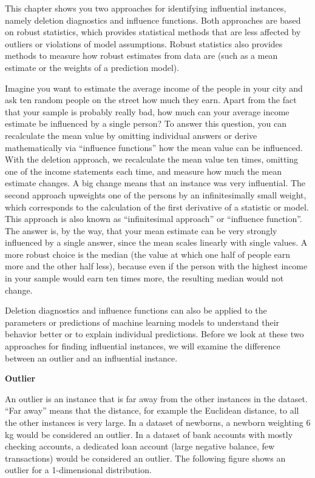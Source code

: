 \documentclass[
  11pt,
]{scrbook}
\begin{document}
This chapter shows you two approaches for identifying influential instances, namely deletion diagnostics and influence functions.
Both approaches are based on robust statistics, which provides statistical methods that are less affected by outliers or violations of model assumptions.
Robust statistics also provides methods to measure how robust estimates from data are (such as a mean estimate or the weights of a prediction model).

Imagine you want to estimate the average income of the people in your city and ask ten random people on the street how much they earn.
Apart from the fact that your sample is probably really bad, how much can your average income estimate be influenced by a single person?
To answer this question, you can recalculate the mean value by omitting individual answers or derive mathematically via ``influence functions'' how the mean value can be influenced.
With the deletion approach, we recalculate the mean value ten times, omitting one of the income statements each time, and measure how much the mean estimate changes.
A big change means that an instance was very influential.
The second approach upweights one of the persons by an infinitesimally small weight, which corresponds to the calculation of the first derivative of a statistic or model.
This approach is also known as ``infinitesimal approach'' or ``influence function''.
The answer is, by the way, that your mean estimate can be very strongly influenced by a single answer, since the mean scales linearly with single values.
A more robust choice is the median (the value at which one half of people earn more and the other half less), because even if the person with the highest income in your sample would earn ten times more, the resulting median would not change.

Deletion diagnostics and influence functions can also be applied to the parameters or predictions of machine learning models to understand their behavior better or to explain individual predictions.
Before we look at these two approaches for finding influential instances, we will examine the difference between an outlier and an influential instance.

\textbf{Outlier}

An outlier is an instance that is far away from the other instances in the dataset.
``Far away'' means that the distance, for example the Euclidean distance, to all the other instances is very large.
In a dataset of newborns, a newborn weighting 6 kg would be considered an outlier.
In a dataset of bank accounts with mostly checking accounts, a dedicated loan account (large negative balance, few transactions) would be considered an outlier.
The following figure shows an outlier for a 1-dimensional distribution.
\end{document}

